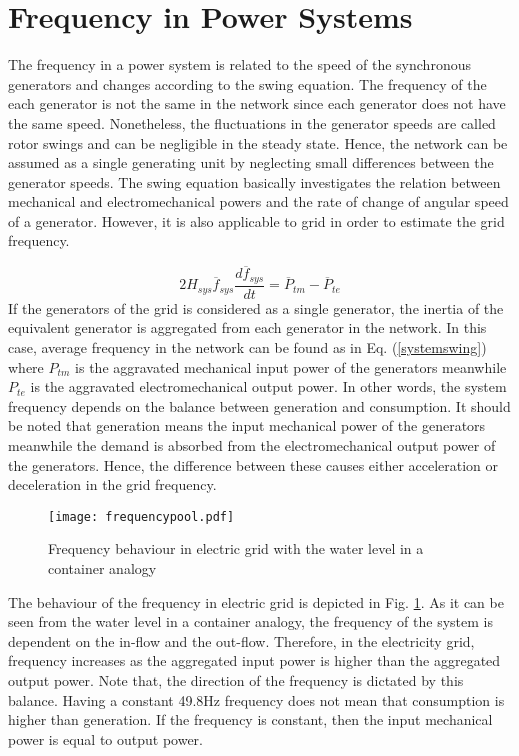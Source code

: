 \section{Frequency in Power Systems}
The frequency in a power system is related to the speed of the synchronous generators and changes according to the swing equation. The frequency of the each generator is not the same in the network since each generator does not have the same speed. Nonetheless, the fluctuations in the generator speeds are called rotor swings and can be negligible in the steady state. Hence, the network can be assumed as a single generating unit by neglecting small differences between the generator speeds. The swing equation basically investigates the relation between mechanical and electromechanical powers and the rate of change of angular speed of a generator. However, it is also applicable to grid in order to estimate the grid frequency.\par
\begin{equation}
\label{systemswing}
2H_{sys}\overline{f}_{sys}\frac{d\overline{f}_{sys}}{dt}=\overline{P}_{tm}-\overline{P}_{te}
\end{equation}
If the generators of the grid is considered as a single generator, the inertia of the equivalent generator is aggregated from each generator in the network. In this case, average frequency in the network can be found as in Eq. (\ref{systemswing}) where $P_{tm}$ is the aggravated mechanical input power of the generators meanwhile $P_{te}$ is the aggravated electromechanical output power. In other words, the system frequency depends on the balance between generation and consumption. It should be noted that generation means the input mechanical power of the generators meanwhile the demand is absorbed from the electromechanical output power of the generators. Hence, the difference between these causes either acceleration or deceleration in the grid frequency. \par
\begin{figure}[h!]
	\centering
	\texttt{[image: frequencypool.pdf]}
	\caption{Frequency behaviour in electric grid with the water level in a container analogy \cite{Eto2010}}
	\label{frequencyingrid}
\end{figure}
The behaviour of the frequency in electric grid is depicted in Fig. \ref{frequencyingrid}. As it can be seen from the water level in a container analogy, the frequency of the system is dependent on the in-flow and the out-flow. Therefore, in the electricity grid, frequency increases as the aggregated input power is higher than the aggregated output power. Note that, the direction of the frequency is dictated by this balance. Having a constant 49.8Hz frequency does not mean that consumption is higher than generation. If the frequency is constant, then the input mechanical power is equal to output power.\par
